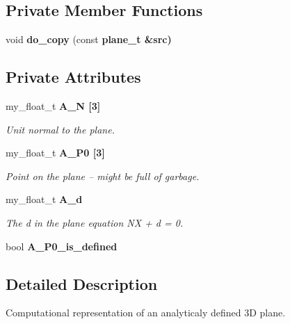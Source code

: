 \subsection*{Private Member Functions}
\begin{CompactItemize}
\item 
void \textbf{do\_\-copy} (const \bf{plane\_\-t} \&src)\label{classASCbase_1_1geometry_1_1plane__t_07d9042854d890d0f1f6d67b24005944}

\end{CompactItemize}
\subsection*{Private Attributes}
\begin{CompactItemize}
\item 
my\_\-float\_\-t \bf{A\_\-N} [3]\label{classASCbase_1_1geometry_1_1plane__t_729fc8d83f6730ffccbf6ebfddaf8f77}

\begin{CompactList}\small\item\em Unit normal to the plane. \item\end{CompactList}\item 
my\_\-float\_\-t \bf{A\_\-P0} [3]\label{classASCbase_1_1geometry_1_1plane__t_9b2e543bd396510e30f8c38b95c13b43}

\begin{CompactList}\small\item\em Point on the plane -- might be full of garbage. \item\end{CompactList}\item 
my\_\-float\_\-t \bf{A\_\-d}\label{classASCbase_1_1geometry_1_1plane__t_d8acc9a64d3c29dd0f25e9a681dcb343}

\begin{CompactList}\small\item\em The d in the plane equation NX + d = 0. \item\end{CompactList}\item 
bool \textbf{A\_\-P0\_\-is\_\-defined}\label{classASCbase_1_1geometry_1_1plane__t_0d32a9703fc45b724246c824c20b8af9}

\end{CompactItemize}


\subsection{Detailed Description}
Computational representation of an analyticaly defined 3D plane. 



